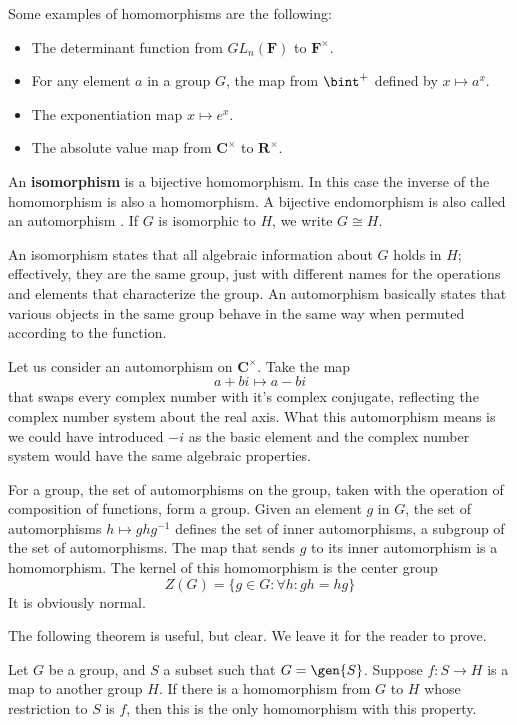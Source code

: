 Some examples of homomorphisms are the following:
\begin{itemize}
    \item The determinant function from $GL_n(\mathbf{F})$ to $\mathbf{F}^\times$.
    \item For any element $a$ in a group $G$, the map from $\bint^+$ defined by $x \mapsto a^x$.
    \item The exponentiation map $x \mapsto e^x$.
    \item The absolute value map from $\mathbf{C}^\times$ to $\mathbf{R}^\times$.
\end{itemize}

\begin{definition}
    An {\bf isomorphism}  is a bijective homomorphism. In this case the inverse of the homomorphism is also a homomorphism. A bijective endomorphism is also called an automorphism . If $G$ is isomorphic to $H$, we write $G \cong H$.
\end{definition}

An isomorphism states that all algebraic information about $G$ holds in $H$; effectively, they are the same group, just with different names for the operations and elements that characterize the group. An automorphism basically states that various objects in the same group behave in the same way when permuted according to the function.

Let us consider an automorphism on $\mathbf{C}^\times$. Take the map
%
\[ a + bi \mapsto a - bi \]
%
that swaps every complex number with it's complex conjugate, reflecting the complex number system about the real axis. What this automorphism means is we could have introduced $-i$ as the basic element and the complex number system would have the same algebraic properties.

For a group, the set of automorphisms on the group, taken with the operation of composition of functions, form a group. Given an element $g$ in $G$, the set of automorphisms $h \mapsto ghg^{-1}$ defines the set of inner automorphisms, a subgroup of the set of automorphisms. The map that sends $g$ to its inner automorphism is a homomorphism. The kernel of this homomorphism is the center group
%
\[Z(G) = \{ g \in G : \forall h: gh = hg \}\]
%
It is obviously normal.

The following theorem is useful, but clear. We leave it for the reader to prove.

\begin{theorem}
    Let $G$ be a group, and $S$ a subset such that $G = \gen{S}$. Suppose $f:S \to H$ is a map to another group $H$. If there is a homomorphism from $G$ to $H$ whose restriction to $S$ is $f$, then this is the only homomorphism with this property.
\end{theorem}

